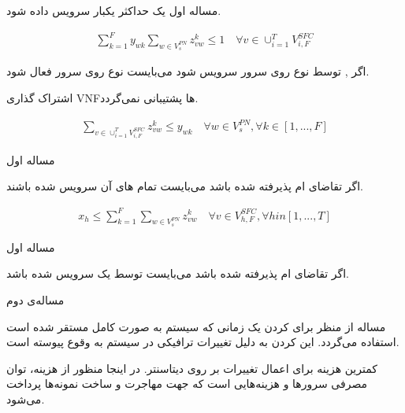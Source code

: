 \documentclass{beamer}
\makeatletter
\newcommand{\RTList}{\raggedleft\rightskip\@totalleftmargin}
\makeatother
\begin{document}
\begin{persian}
\begin{frame}{مساله اول}
	یک  حداکثر یکبار سرویس داده شود.
	\begin{latin}\begin{align}
	\sum_{k=1}^Fy_{wk}\sum_{w \in V_s^{PN}} z_{vw}^{k} \le 1
	\quad
	\forall v \in \cup_{i=1}^T V_{i, F}^{SFC}
	\end{align}\end{latin}
	\par
	اگر , 
	توسط  نوع 
	روی سرور  سرویس شود می‌بایست
	 نوع 
	روی سرور  فعال شود.
	\par
	اشتراک گذاری VNFها پشتیبانی نمی‌گردد.
	\begin{latin}\begin{align}
	\sum_{v \in \cup_{i=1}^T V_{i, F}^{SFC}} z_{vw}^k \le y_{wk}
	\quad
	\forall w \in V_s^{PN}, \forall k \in [1, ..., F]
	\end{align}\end{latin}
\end{frame}
\begin{frame}{مساله اول}
	\par
	اگر تقاضای ام پذیرفته شده باشد
	می‌بایست تمام های آن‌
	سرویس شده باشند.
	\begin{latin}\begin{align}
		x_h \le \sum_{k=1}^{F} \sum_{w \in V_{s}^{PN}} z_{vw}^{k}
		\quad
		\forall v \in V_{h,F}^{SFC}, \forall h in [1, ..., T]
	\end{align}\end{latin}
\end{frame}
\begin{frame}{مساله اول}
	\par
	اگر تقاضای ام پذیرفته شده باشد
	می‌بایست توسط یک  سرویس شده باشد.
\end{frame}
\begin{frame}{مساله‌ی دوم}
	\par
	مساله از منظر  برای  کردن یک 
	زمانی که سیستم به صورت کامل مستقر شده است استفاده می‌گردد.
	این  کردن به دلیل تغییرات ترافیکی در سیستم به وقوع پیوسته است.
\end{frame}
\begin{frame}
	\par
	کمترین هزینه برای اعمال تغییرات بر روی دیتاسنتر.
	در اینجا منظور از هزینه، توان مصرفی سرورها و هزینه‌هایی است که جهت مهاجرت و ساخت نمونه‌ها پرداخت می‌شود.
\end{frame}
\begin{frame}
	\begin{itemize}\RTList

\end{itemize}
\end{frame}
\end{persian}
\end{document}
